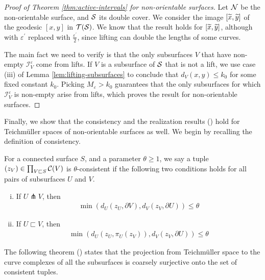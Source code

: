 \documentclass[12pt, reqno]{amsart}
\begin{document}
\begin{proof}[Proof of Theorem \ref{thm:active-intervals} for non-orientable surfaces]
  Let $\mathcal{N}$ be the non-orientable surface, and $\mathcal{S}$ its double cover.
  We consider the image $[\widetilde{x}, \widetilde{y}]$ of the geodesic $[x,y]$ in $\mathcal{T}(\mathcal{S})$.
  We know that the result holds for $[\widetilde{x}, \widetilde{y}]$, although with $\varepsilon^{\prime}$ replaced with $\frac{\varepsilon^{\prime}}{2}$, since lifting can double the lengths of some curves.

  The main fact we need to verify is that the only subsurfaces $V$ that have non-empty $\mathcal{I}_V^\varepsilon$ come from lifts.
  If $V$ is a subsurface of $\mathcal{S}$ that is not a lift, we use case (iii) of Lemma \ref{lem:lifting-subsurfaces} to conclude that $d_V(x, y) \leq k_0$ for some fixed constant $k_0$.
  Picking $M_\varepsilon > k_0$ guarantees that the only subsurfaces for which $\mathcal{I}_V^\varepsilon$ is non-empty arise from lifts, which proves the result for non-orientable surfaces.
\end{proof}

Finally, we show that the consistency and the realization results (\textcite{behrstock2012geometry}) hold for Teichmüller spaces of non-orientable surfaces as well.
We begin by recalling the definition of consistency.

\begin{definition}[Consistency]
  For a connected surface $S$, and a parameter $\theta \geq 1$, we say a tuple $(z_V) \in \prod_{V \sqsubset S} \mathcal{C}(V)$ is $\theta$-consistent if the following two conditions holds for all pairs of subsurfaces $U$ and $V$.
  \begin{enumerate}[(i)]
  \item If $U \pitchfork V$, then
    \begin{align*}
      \min(d_U(z_U, \partial V), d_V(z_V, \partial U)) \leq \theta
    \end{align*}
  \item If $U \sqsubset V$, then
    \begin{align*}
      \min(d_U(z_U, \pi_U(z_V)), d_V(z_V, \partial U)) \leq \theta
    \end{align*}
  \end{enumerate}
\end{definition}

The following theorem (\textcite[Theorem 4.3]{behrstock2012geometry}) states that the projection from Teichmüller space to the curve complexes of all the subsurfaces is coarsely surjective onto the set of consistent tuples.
\end{document}
